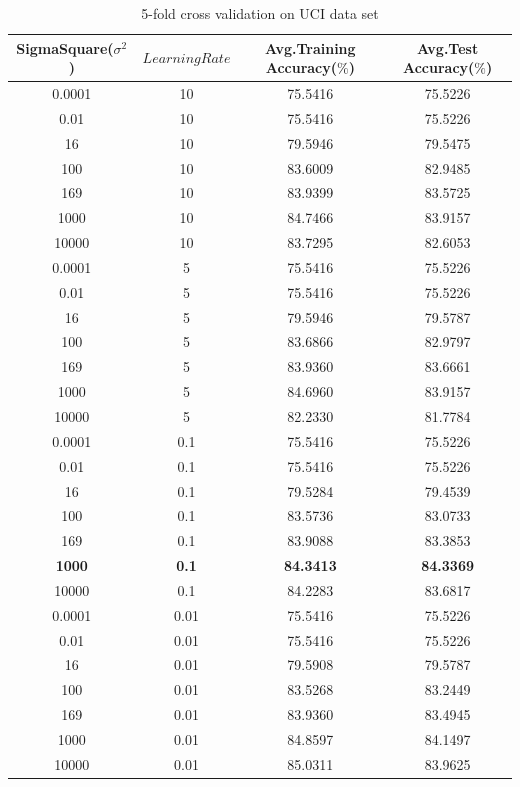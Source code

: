 \documentclass{article}
\begin{document}
 \begin{longtable}{c|c|c|c}
  \caption{5-fold cross validation on UCI data set} \\
  \hline\hline
	  SigmaSquare($\sigma^2$) & $LearningRate$ & Avg.Training Accuracy($\%$) & Avg.Test Accuracy($\%$) \\[1ex]
  \hline
 0.0001 &    10 & 75.5416 & 75.5226 \\
   0.01 &    10 & 75.5416 & 75.5226 \\
     16 &    10 & 79.5946 & 79.5475 \\
    100 &    10 & 83.6009 & 82.9485 \\
    169 &    10 & 83.9399 & 83.5725 \\
   1000 &    10 & 84.7466 & 83.9157 \\
  10000 &    10 & 83.7295 & 82.6053 \\
 0.0001 &     5 & 75.5416 & 75.5226 \\
   0.01 &     5 & 75.5416 & 75.5226 \\
     16 &     5 & 79.5946 & 79.5787 \\
    100 &     5 & 83.6866 & 82.9797 \\
    169 &     5 & 83.9360 & 83.6661 \\
   1000 &     5 & 84.6960 & 83.9157 \\
  10000 &     5 & 82.2330 & 81.7784 \\
 0.0001 &   0.1 & 75.5416 & 75.5226 \\
   0.01 &   0.1 & 75.5416 & 75.5226 \\
     16 &   0.1 & 79.5284 & 79.4539 \\
    100 &   0.1 & 83.5736 & 83.0733 \\
    169 &   0.1 & 83.9088 & 83.3853 \\
  \textbf{1000} &   \textbf{0.1} & \textbf{84.3413} & \textbf{84.3369} \\
  10000 &   0.1 & 84.2283 & 83.6817 \\
 0.0001 &  0.01 & 75.5416 & 75.5226 \\
   0.01 &  0.01 & 75.5416 & 75.5226 \\
     16 &  0.01 & 79.5908 & 79.5787 \\
    100 &  0.01 & 83.5268 & 83.2449 \\
    169 &  0.01 & 83.9360 & 83.4945 \\
   1000 &  0.01 & 84.8597 & 84.1497 \\
  10000 &  0.01 & 85.0311 & 83.9625 \\

\end{longtable}
\end{document}
